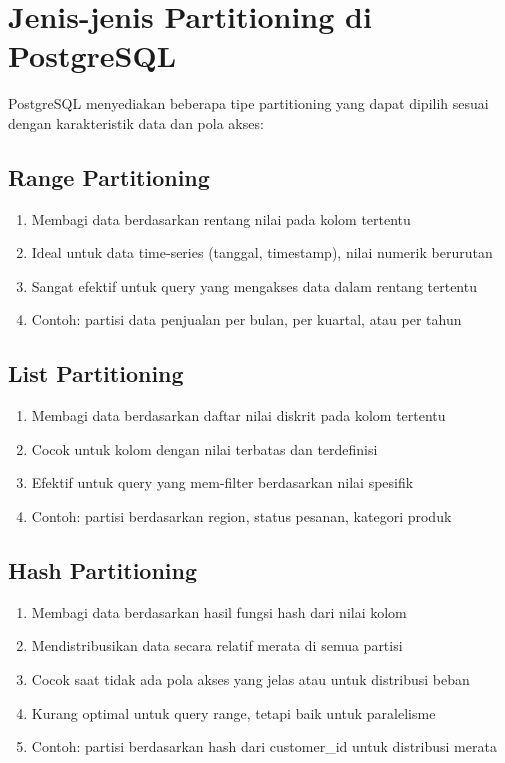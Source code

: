 \section{Jenis-jenis Partitioning di PostgreSQL}

PostgreSQL menyediakan beberapa tipe partitioning yang dapat dipilih sesuai dengan karakteristik data dan pola akses:

\subsection{Range Partitioning}
\begin{enumerate}
    \item Membagi data berdasarkan rentang nilai pada kolom tertentu
    \item Ideal untuk data time-series (tanggal, timestamp), nilai numerik berurutan
    \item Sangat efektif untuk query yang mengakses data dalam rentang tertentu
    \item Contoh: partisi data penjualan per bulan, per kuartal, atau per tahun
\end{enumerate}

\subsection{List Partitioning}
\begin{enumerate}
    \item Membagi data berdasarkan daftar nilai diskrit pada kolom tertentu
    \item Cocok untuk kolom dengan nilai terbatas dan terdefinisi
    \item Efektif untuk query yang mem-filter berdasarkan nilai spesifik
    \item Contoh: partisi berdasarkan region, status pesanan, kategori produk
\end{enumerate}

\subsection{Hash Partitioning}
\begin{enumerate}
    \item Membagi data berdasarkan hasil fungsi hash dari nilai kolom
    \item Mendistribusikan data secara relatif merata di semua partisi
    \item Cocok saat tidak ada pola akses yang jelas atau untuk distribusi beban
    \item Kurang optimal untuk query range, tetapi baik untuk paralelisme
    \item Contoh: partisi berdasarkan hash dari customer\_id untuk distribusi merata
\end{enumerate}

